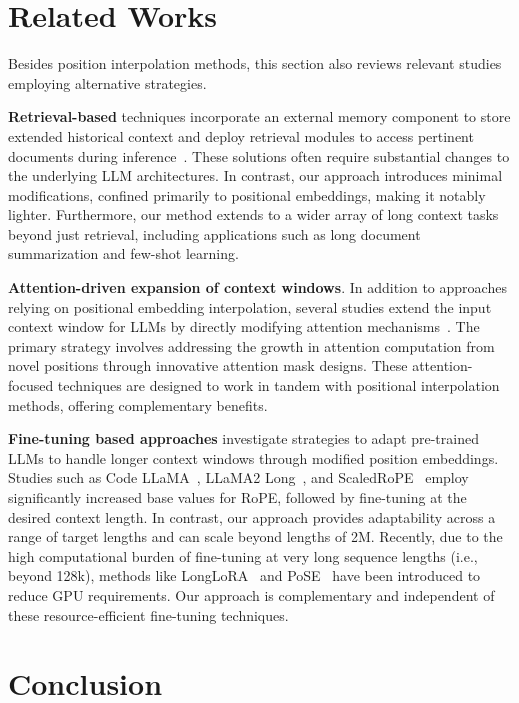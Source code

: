 \section{Related Works}

Besides position interpolation methods, this section also reviews relevant studies employing alternative strategies.

\textbf{Retrieval-based} techniques incorporate an external memory component to store extended historical context and deploy retrieval modules to access pertinent documents during inference~\cite{longllama,wang2023augmenting,borgeaud2022improving}. These solutions often require substantial changes to the underlying LLM architectures. In contrast, our approach introduces minimal modifications, confined primarily to positional embeddings, making it notably lighter. Furthermore, our method extends to a wider array of long context tasks beyond just retrieval, including applications such as long document summarization and few-shot learning.

\textbf{Attention-driven expansion of context windows}. In addition to approaches relying on positional embedding interpolation, several studies extend the input context window for LLMs by directly modifying attention mechanisms~\cite{han2023lminfinite, streamingllm,parallelwindow}. The primary strategy involves addressing the growth in attention computation from novel positions through innovative attention mask designs. These attention-focused techniques are designed to work in tandem with positional interpolation methods, offering complementary benefits.

\textbf{Fine-tuning based approaches} investigate strategies to adapt pre-trained LLMs to handle longer context windows through modified position embeddings. Studies such as Code LLaMA~\cite{codellama}, LLaMA2 Long~\cite{xiong2023effective}, and ScaledRoPE~\cite{liu2023scaling} employ significantly increased base values for RoPE, followed by fine-tuning at the desired context length. In contrast, our approach provides adaptability across a range of target lengths and can scale beyond lengths of 2M. Recently, due to the high computational burden of fine-tuning at very long sequence lengths (i.e., beyond 128k), methods like LongLoRA~\cite{longlora} and PoSE~\cite{zhu2023pose} have been introduced to reduce GPU requirements. Our approach is complementary and independent of these resource-efficient fine-tuning techniques.

\section{Conclusion}

